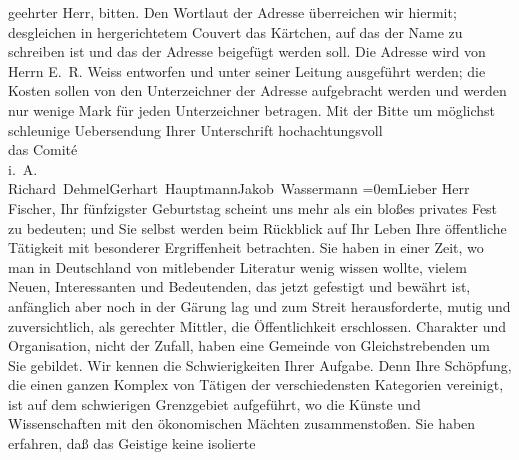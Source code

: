 \begin{ledgroupsized}[t]{13cm}
                    geehrter Herr, bitten. Den Wortlaut der Adresse überreichen wir hiermit;
                    desgleichen in hergerichtetem Couvert das Kärtchen, auf das der Name zu
                    schreiben ist und das der Adresse beigefügt werden soll. Die Adresse wird von
                    Herrn E. R. Weiss entworfen und unter seiner
                    Leitung ausgeführt werden; die Kosten sollen von den Unterzeichner der Adresse
                    aufgebracht werden und werden nur wenige Mark für jeden Unterzeichner
                    betragen.\pend
           \pstart
           Mit der Bitte um möglichst schleunige Uebersendung Ihrer Unterschrift\pend
           \pstart
           hochachtungsvoll{\\[\baselineskip]}das Comité{\\[\baselineskip]}i. A.{\\[\baselineskip]}\spacefill\mbox{Richard Dehmel\hspace*{1.5em}Gerhart Hauptmann\hspace*{1.5em}Jakob Wassermann}\pend
           \leftskip=0em{}\pstart{}{\pb}Lieber Herr Fischer,\pend\pstart
           Ihr fünfzigster Geburtstag scheint uns mehr als ein bloßes privates Fest zu
                    bedeuten; und Sie selbst werden beim Rückblick auf Ihr Leben Ihre öffentliche
                    Tätigkeit mit besonderer Ergriffenheit betrachten. Sie haben in einer Zeit, wo
                    man in Deutschland von mitlebender Literatur
                    wenig wissen wollte, vielem Neuen, Interessanten und Bedeutenden, das jetzt
                    gefestigt und bewährt ist, anfänglich aber noch in der Gärung lag und zum Streit
                    herausforderte, mutig und zuversichtlich, als gerechter Mittler, die
                    Öffentlichkeit erschlossen. Charakter und Organisation, nicht der Zufall, haben
                    eine Gemeinde von Gleichstrebenden um Sie gebildet. Wir kennen die
                    Schwierigkeiten Ihrer Aufgabe. Denn Ihre Schöpfung, die einen ganzen Komplex von
                    Tätigen der verschiedensten Kategorien vereinigt, ist auf dem schwierigen
                    Grenzgebiet aufgeführt, wo die Künste und Wissenschaften mit den ökonomischen
                    Mächten zusammenstoßen. Sie haben erfahren, daß das Geistige keine isolierte

\end{ledgroupsized}
